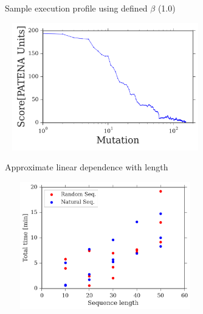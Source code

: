 \documentclass{beamer}
\begin{document}
\begin{frame}[plain]{Sample execution profile using defined $\beta$ (1.0)}
\begin{adjustwidth}{-1.5em}{-2.5em}
\centering

\includegraphics[width=330px,height=210px]{../img/iterationVsScore-individualBeta1-EXAMPLE.png}

\end{adjustwidth}
\end{frame}







\begin{frame}[plain]{Approximate linear dependence with length}
\centering
\begin{adjustwidth}{-1.5em}{-2.5em}
\includegraphics[width=330px,height=210px]{../img/lengthVsTime.png} 
\end{adjustwidth}
\end{frame}
\end{document}

